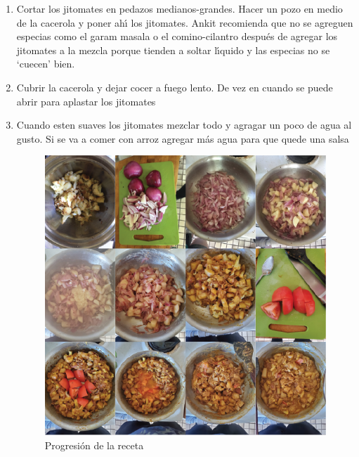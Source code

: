 \begin{enumerate}
\item Cortar los jitomates en pedazos medianos-grandes. Hacer un pozo en medio de la cacerola y poner ah\'{\i} los jitomates. Ankit recomienda que no se agreguen especias como el garam masala o el comino-cilantro despu\'es de agregar los jitomates a la mezcla porque tienden a soltar l\'{\i}quido y las especias no se `cuecen' bien. 
\item Cubrir la cacerola y dejar cocer a fuego lento. De vez en cuando se puede abrir para aplastar los jitomates
\item Cuando esten suaves los jitomates mezclar todo y agragar un poco de agua al gusto. Si se va a comer con arroz agregar m\'as agua para que quede una salsa 

\begin{figure}[H]
\centering
\includegraphics[width=1\textwidth]{recetas/Aloo-gobi/aloo-gobi.png}
\caption{Progresi\'on de la receta}
\label{fig:aloo-gobi}
\end{figure}

\end{enumerate}